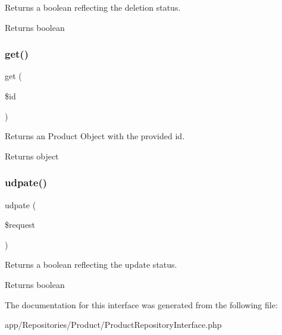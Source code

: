 Returns a boolean reflecting the deletion status.

\begin{DoxyReturn}{Returns}
boolean 
\end{DoxyReturn}
\mbox{\label{interface_app_1_1_repositories_1_1_product_1_1_product_repository_interface_a50e3bfb586b2f42932a6a93f3fbb0828}} 
\subsubsection{\texorpdfstring{get()}{get()}}
{\footnotesize\ttfamily get (\begin{DoxyParamCaption}\item[{}]{\$id }\end{DoxyParamCaption})}

Returns an Product Object with the provided id.

\begin{DoxyReturn}{Returns}
object 
\end{DoxyReturn}
\mbox{\label{interface_app_1_1_repositories_1_1_product_1_1_product_repository_interface_a2aedea52c52e54ba3c4c9f60423e7ef1}} 
\subsubsection{\texorpdfstring{udpate()}{udpate()}}
{\footnotesize\ttfamily udpate (\begin{DoxyParamCaption}\item[{}]{\$request }\end{DoxyParamCaption})}

Returns a boolean reflecting the update status.

\begin{DoxyReturn}{Returns}
boolean 
\end{DoxyReturn}


The documentation for this interface was generated from the following file\+:\begin{DoxyCompactItemize}
\item 
app/\+Repositories/\+Product/Product\+Repository\+Interface.\+php\end{DoxyCompactItemize}
